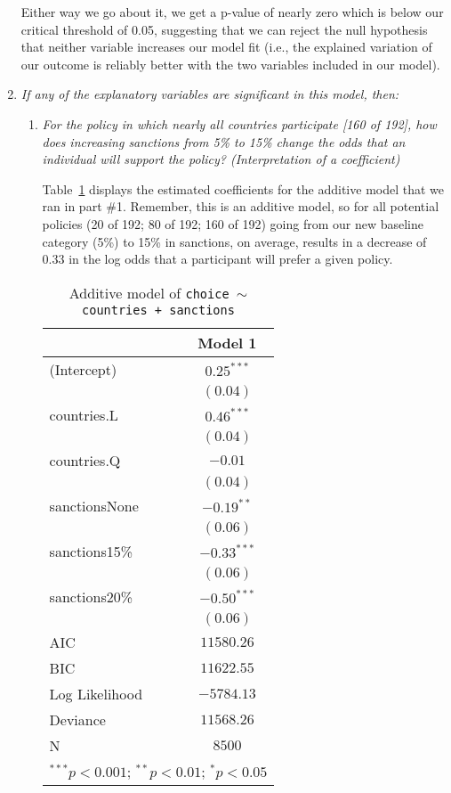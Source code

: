 \documentclass[12pt,letterpaper]{article}
\begin{document}
\begin{enumerate}
	Either way we go about it, we get a p-value of nearly zero which is below our critical threshold of 0.05, suggesting that we can reject the null hypothesis that neither variable increases our model fit (i.e., the explained variation of our outcome is reliably better with the two variables included in our model).
		
	\item
	\textit{If any of the explanatory variables are significant in this model, then:}
	\begin{enumerate}
		\item
		\textit{For the policy in which nearly all countries participate [160 of 192], how does increasing sanctions from 5\% to 15\% change the odds that an individual will support the policy? (Interpretation of a coefficient)}
		
		Table~\ref{table:coefficients} displays the estimated coefficients for the additive model that we ran in part \#1. Remember, this is an additive model, so for all potential policies (20 of 192; 80 of 192; 160 of 192) going from our new baseline category (5\%)  to 15\% in sanctions, on average, results in a decrease of 0.33 in the log odds that a participant will prefer a given policy.
		
		\begin{table}[b!]
			\caption{Additive model of \texttt{choice $\sim$ countries + sanctions}}
				\vspace{.25cm}
			\label{table:coefficients}
\centering
	\begin{adjustbox}{width=.3\textwidth}
\begin{tabular}{l c}
\hline
 & Model 1 \\
\hline
(Intercept)    & $0.25^{***}$  \\
               & $(0.04)$      \\
countries.L    & $0.46^{***}$  \\
               & $(0.04)$      \\
countries.Q    & $-0.01$       \\
               & $(0.04)$      \\
sanctionsNone  & $-0.19^{**}$  \\
               & $(0.06)$      \\
sanctions15\%  & $-0.33^{***}$ \\
               & $(0.06)$      \\
sanctions20\%  & $-0.50^{***}$ \\
               & $(0.06)$      \\
\hline
AIC            & $11580.26$    \\
BIC            & $11622.55$    \\
Log Likelihood & $-5784.13$    \\
Deviance       & $11568.26$    \\
N     & $8500$        \\
\hline
\multicolumn{2}{l}{\scriptsize{$^{***}p<0.001$; $^{**}p<0.01$; $^{*}p<0.05$}}
\end{tabular}
\end{adjustbox}
\end{table}
		

\end{enumerate}
\end{enumerate}
\end{document}
